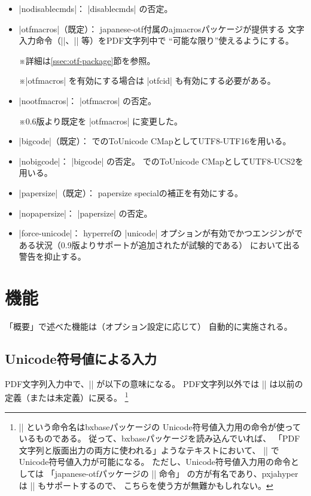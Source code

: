\documentclass[uplatex,dvipdfmx,a4paper]{jsarticle}
\newcommand{\Pkg}[1]{\textsf{#1}}
\newcommand{\Note}{\par\noindent ※}
\newcommand{\Means}{：\quad}
\providecommand{\Strong}[1]{\textsf{#1}}
\begin{document}
\begin{itemize}
\item |nodisablecmds|\Means
  |disablecmds| の否定。
\item |otfmacros|（既定）\Means
  \Pkg{japanese-otf}付属の\Pkg{ajmacros}パッケージが提供する
  文字入力命令（|\ajMaru|、|\ajLig| 等）をPDF文字列中で
  “可能な限り”使えるようにする。
  \Note 詳細は\ref{ssec:otf-package}節を参照。
  \Note |otfmacros| を有効にする場合は |otfcid| も有効にする必要がある。
\item |nootfmacros|\Means
  |otfmacros| の否定。
  \Note 0.6版より既定を |otfmacros| に変更した。
\item |bigcode|（既定）\Means
  {\upTeX}でのToUnicode CMapとしてUTF8-UTF16を用いる。
\item |nobigcode|\Means
  |bigcode| の否定。
  {\upTeX}でのToUnicode CMapとしてUTF8-UCS2を用いる。
\item |papersize|（既定）\Means
  papersize specialの補正を有効にする。
\item |nopapersize|\Means
  |papersize| の否定。
\item |force-unicode|\Means
  \Pkg{hyperref}の |unicode| オプションが有効でかつエンジンが{\pTeX}で
  ある状況（0.9版よりサポートが追加されたが\Strong{試験的}である）
  において出る警告を抑止する。
\end{itemize}

\section{機能}

「概要」で述べた機能は（オプション設定に応じて）
自動的に実施される。

\subsection{Unicode符号値による入力}
\label{ssec:ux-command}

PDF文字列入力中で、|\Ux| が以下の意味になる。
PDF文字列以外では |\Ux| は以前の定義（または未定義）に戻る。
\footnote{|\Ux| という命令名は\Pkg{bxbase}パッケージの
Unicode符号値入力用の命令が使っているものである。
従って、\Pkg{bxbase}パッケージを読み込んでいれば、
「PDF文字列と版面出力の両方に使われる」ようなテキストにおいて、
|\Ux| でUnicode符号値入力が可能になる。
ただし、Unicode符号値入力用の命令としては
「\Pkg{japanese-otf}パッケージの |\UTF| 命令」
の方が有名であり、\Pkg{pxjahyper}は |\UTF| もサポートするので、
こちらを使う方が無難かもしれない。}
\end{document}
